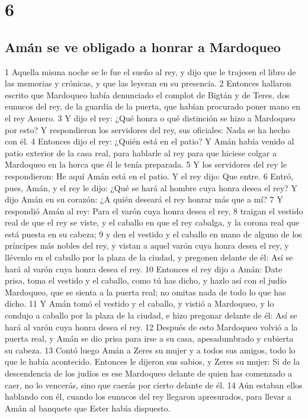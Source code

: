 \chapter{6}

\section*{Amán se ve obligado a honrar a Mardoqueo}


1 Aquella misma noche se le fue el sueño al rey, y dijo que le trajesen el libro de las memorias y crónicas, y que las leyeran en su presencia.
2 Entonces hallaron escrito que Mardoqueo había denunciado el complot de Bigtán y de Teres, dos eunucos del rey, de la guardia de la puerta, que habían procurado poner mano en el rey Asuero. 
3 Y dijo el rey: ¿Qué honra o qué distinción se hizo a Mardoqueo por esto? Y respondieron los servidores del rey, sus oficiales: Nada se ha hecho con él.
4 Entonces dijo el rey: ¿Quién está en el patio? Y Amán había venido al patio exterior de la casa real, para hablarle al rey para que hiciese colgar a Mardoqueo en la horca que él le tenía preparada.
5 Y los servidores del rey le respondieron: He aquí Amán está en el patio. Y el rey dijo: Que entre.
6 Entró, pues, Amán, y el rey le dijo: ¿Qué se hará al hombre cuya honra desea el rey? Y dijo Amán en su corazón: ¿A quién deseará el rey honrar más que a mí?
7 Y respondió Amán al rey: Para el varón cuya honra desea el rey,
8 traigan el vestido real de que el rey se viste, y el caballo en que el rey cabalga, y la corona real que está puesta en su cabeza;
9 y den el vestido y el caballo en mano de alguno de los príncipes más nobles del rey, y vistan a aquel varón cuya honra desea el rey, y llévenlo en el caballo por la plaza de la ciudad, y pregonen delante de él: Así se hará al varón cuya honra desea el rey.
10 Entonces el rey dijo a Amán: Date prisa, toma el vestido y el caballo, como tú has dicho, y hazlo así con el judío Mardoqueo, que se sienta a la puerta real; no omitas nada de todo lo que has dicho.
11 Y Amán tomó el vestido y el caballo, y vistió a Mardoqueo, y lo condujo a caballo por la plaza de la ciudad, e hizo pregonar delante de él: Así se hará al varón cuya honra desea el rey.
12 Después de esto Mardoqueo volvió a la puerta real, y Amán se dio prisa para irse a su casa, apesadumbrado y cubierta su cabeza.
13 Contó luego Amán a Zeres su mujer y a todos sus amigos, todo lo que le había acontecido. Entonces le dijeron sus sabios, y Zeres su mujer: Si de la descendencia de los judíos es ese Mardoqueo delante de quien has comenzado a caer, no lo vencerás, sino que caerás por cierto delante de él.
14 Aún estaban ellos hablando con él, cuando los eunucos del rey llegaron apresurados, para llevar a Amán al banquete que Ester había dispuesto.

